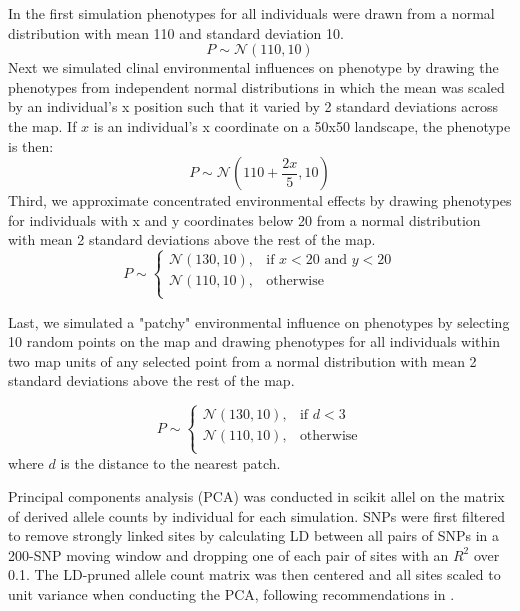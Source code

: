 \documentclass[11pt,twoside,lineno]{preprint}
\begin{document}
In the first simulation phenotypes for all individuals were drawn from a normal distribution with mean 110 and standard deviation 10.
\begin{equation}
    P \sim \mathcal{N}(110,10)
\end{equation}
Next we simulated clinal environmental influences on phenotype by drawing the phenotypes from independent normal distributions in which the mean was scaled by an individual's x position such that it varied by 2 standard deviations across the map. If $x$ is an individual's x coordinate on a 50x50 landscape, the phenotype is then:
\begin{equation}
    P \sim \mathcal{N}(110+\frac{2x}{5},10)
\end{equation}
Third, we approximate concentrated environmental effects by drawing phenotypes for individuals with x and y coordinates below 20 from a normal distribution with mean 2 standard deviations above the rest of the map. 
\begin{equation}
    P\sim
\begin{cases}
    \mathcal{N}(130,10),& \text{if } x< 20 \text{ and } y<20\\
    \mathcal{N}(110,10),& \text{otherwise}\\
\end{cases}
\end{equation}

Last, we simulated a "patchy" environmental influence on phenotypes by selecting 10 random points on the map and drawing phenotypes for all individuals within two map units of any selected point from a normal distribution with mean 2 standard deviations above the rest of the map. 

\begin{equation}
    P\sim
\begin{cases}
    \mathcal{N}(130,10),& \text{if } d < 3\\
    \mathcal{N}(110,10),& \text{otherwise}\\
\end{cases}
\end{equation}
where $d$ is the distance to the nearest patch. 

Principal components analysis (PCA) was conducted in scikit allel on the matrix of derived allele counts by individual for each simulation. SNPs were first filtered to remove strongly linked sites by calculating LD between all pairs of SNPs in a 200-SNP moving window and dropping one of each pair of sites with an $R^2$ over 0.1. The LD-pruned allele count matrix was then centered and all sites scaled to unit variance when conducting the PCA, following recommendations in \citep{Patterson2006}.   
\end{document}
